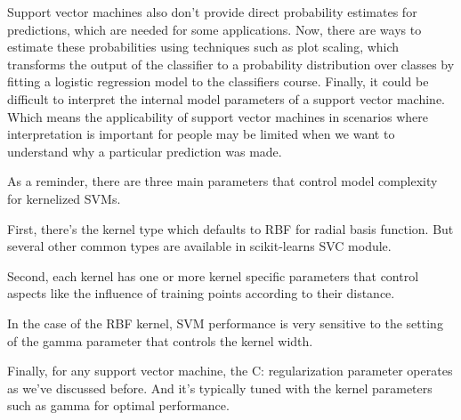 \begin{multicols}{2}
Support vector machines also don't provide direct probability estimates for predictions, which are needed for some applications. Now, there are ways to estimate these probabilities using techniques such as plot scaling, which transforms the output of the classifier to a probability distribution over classes by fitting a logistic regression model to the classifiers course. Finally, it could be difficult to interpret the internal model parameters of a support vector machine. Which means the applicability of support vector machines in scenarios where interpretation is important for people may be limited when we want to understand why a particular prediction was made. 

As a reminder, there are three main parameters that control model complexity for kernelized SVMs. 

First, there's the kernel type which defaults to RBF for radial basis function. But several other common types are available in scikit-learns SVC module. 

Second, each kernel has one or more kernel specific parameters that control aspects like the influence of training points according to their distance. 

In the case of the RBF kernel, SVM performance is very sensitive to the setting of the gamma parameter that controls the kernel width. 

Finally, for any support vector machine, the C: regularization parameter operates as we've discussed before. And it's typically tuned with the kernel parameters such as gamma for optimal performance. 

\end{multicols}